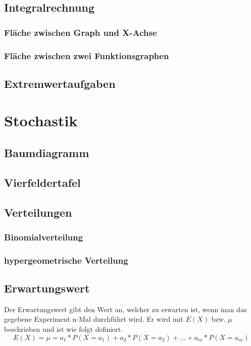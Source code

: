 \documentclass[a4paper]{article}
\begin{document}
		\subsection{Integralrechnung}
			\subsubsection{Fläche zwischen Graph und X-Achse}
			\subsubsection{Fläche zwischen zwei Funktionsgraphen}
		\subsection{Extremwertaufgaben}

	\section{Stochastik}
		\subsection{Baumdiagramm}
		\subsection{Vierfeldertafel}
		\subsection{Verteilungen}
			\subsubsection{Binomialverteilung}
			\subsubsection{hypergeometrische Verteilung}
		\subsection{Erwartungswert}
			Der Erwartungswert gibt den Wert an, welcher zu erwarten ist, wenn man das gegebene Experiment n-Mal durchführt wird. Er wird mit $E\left(X\right)$ bzw. $\mu$ beschrieben und ist wie folgt definiert.
			\begin{equation}
				E(X) = \mu = a_1 * P(X = a_1) + a_2 * P(X = a_2) + \dotsc + a_m * P(X = a_m)
			\end{equation}
\end{document}
